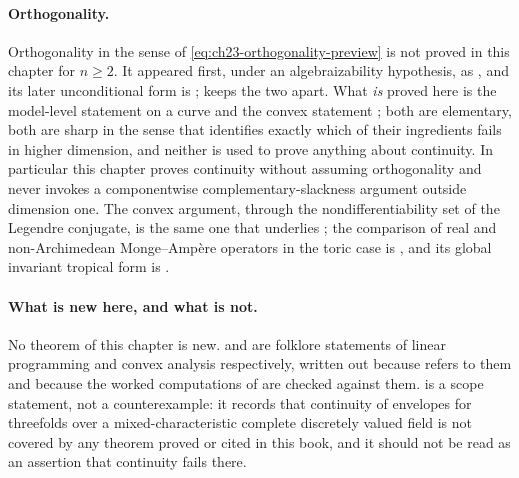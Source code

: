 \paragraph{Orthogonality.}
Orthogonality in the sense of
\eqref{eq:ch23-orthogonality-preview} is not proved in this chapter for
\(n\geq2\).  It appeared first, under an algebraizability hypothesis, as
\cite[Theorem~A.4]{BFJ15}, and its later unconditional form is
\cite{BGGJKM20};  keeps the two apart.
What \emph{is} proved here is the model-level statement
 on a curve and the convex
statement ; both are
elementary, both are sharp in the sense that
 identifies exactly which of their
ingredients fails in higher dimension, and neither is used to prove
anything about continuity.  In particular this chapter proves continuity
without assuming orthogonality and never invokes a componentwise
complementary-slackness argument outside dimension one.  The convex
argument, through the nondifferentiability set of the Legendre conjugate, is
the same one that underlies ; the
comparison of real and non-Archimedean Monge--Amp\`ere operators in the
toric case is \cite{Vil20}, and its global invariant tropical form is
\cite{BGJKK25}.

\paragraph{What is new here, and what is not.}
No theorem of this chapter is new.
 and
 are folklore statements of
linear programming and convex analysis respectively, written out because
 refers to them and because the
worked computations of  are checked against them.
 is a scope statement, not a counterexample: it
records that continuity of envelopes for threefolds over a
mixed-characteristic complete discretely valued field is not covered by any
theorem proved or cited in this book, and it should not be read as an
assertion that continuity fails there.
